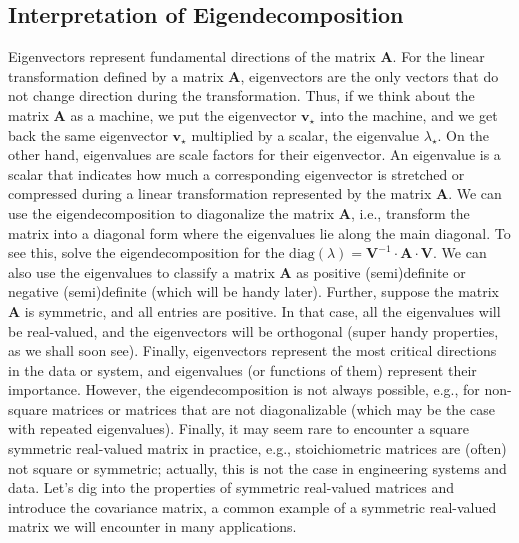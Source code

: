 \documentclass{article}[11pt]
\begin{document}
\subsection{Interpretation of Eigendecomposition}
Eigenvectors represent fundamental directions of the matrix $\mathbf{A}$. For the linear transformation defined by a matrix $\mathbf{A}$, eigenvectors are the only vectors that do not change direction during the transformation. 
Thus, if we think about the matrix $\mathbf{A}$ as a machine, we put the eigenvector $\mathbf{v}_{\star}$ into the machine, and we get back the same eigenvector $\mathbf{v}_{\star}$ multiplied by a scalar, the eigenvalue $\lambda_{\star}$.
On the other hand, eigenvalues are scale factors for their eigenvector. An eigenvalue is a scalar that indicates how much a corresponding eigenvector is stretched or compressed during a linear transformation represented by the matrix $\mathbf{A}$.
We can use the eigendecomposition to diagonalize the matrix $\mathbf{A}$, i.e., transform the matrix into a diagonal form where the eigenvalues lie along the main diagonal. To see this, solve the eigendecomposition for the $\text{diag}(\lambda) = \mathbf{V}^{-1}\cdot\mathbf{A}\cdot\mathbf{V}$. 
We can also use the eigenvalues to classify a matrix $\mathbf{A}$ as positive (semi)definite or negative (semi)definite (which will be handy later). 
Further, suppose the matrix $\mathbf{A}$ is symmetric, and all entries are positive. In that case, all the eigenvalues will be real-valued, and the eigenvectors will be orthogonal (super handy properties, as we shall soon see).
Finally, eigenvectors represent the most critical directions in the data or system, and eigenvalues (or functions of them) represent their importance. However, the eigendecomposition is not always possible, e.g., for non-square matrices or matrices that are not diagonalizable (which may be the case with repeated eigenvalues). Finally, it may seem rare to encounter a square symmetric real-valued matrix in practice, e.g., stoichiometric matrices are (often) not square or symmetric; actually, this is not the case in engineering systems and data. Let's dig into the properties of symmetric real-valued matrices and introduce the covariance matrix, a common example of a symmetric real-valued matrix we will encounter in many applications.
\end{document}
